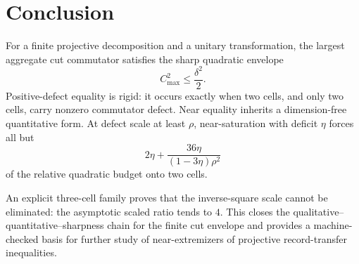 \documentclass[11pt]{article}
\newcommand{\cmax}{C_{\max}}
\newcommand{\dd}{\delta}
\newcommand{\etaq}{\eta}
\begin{document}
\section{Conclusion}

For a finite projective decomposition and a unitary transformation, the
largest aggregate cut commutator satisfies the sharp quadratic envelope
\[
  \cmax^2\le\frac{\dd^2}{2}.
\]
Positive-defect equality is rigid: it occurs exactly when two cells, and only
two cells, carry nonzero commutator defect.  Near equality inherits a
dimension-free quantitative form.  At defect scale at least $\rho$,
near-saturation with deficit $\etaq$ forces all but
\[
  2\etaq+
  \frac{36\etaq}{(1-3\etaq)\rho^2}
\]
of the relative quadratic budget onto two cells.

An explicit three-cell family proves that the inverse-square scale cannot be
eliminated: the asymptotic scaled ratio tends to $4$.  This closes the
qualitative--quantitative--sharpness chain for the finite cut envelope and
provides a machine-checked basis for further study of near-extremizers of
projective record-transfer inequalities.



\end{document}
